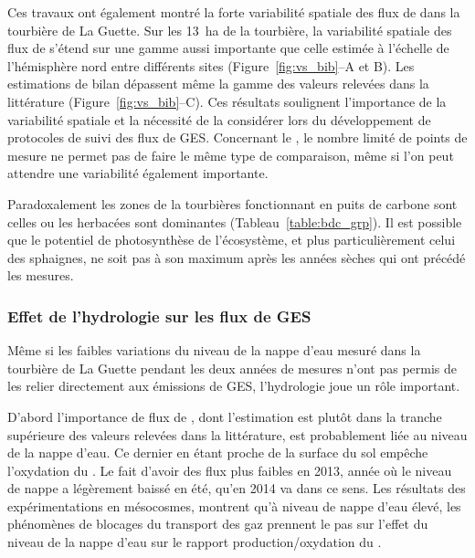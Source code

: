 Ces travaux ont également montré la forte variabilité spatiale des flux de \coo dans la tourbière de La Guette.
Sur les \SI{13}{\hectare} de la tourbière, la variabilité spatiale des flux de \coo s'étend sur une gamme aussi importante que celle estimée à l'échelle de l'hémisphère nord entre différents sites (Figure~\ref{fig:vs_bib}--A et B).
Les estimations de bilan dépassent même la gamme des valeurs relevées dans la littérature (Figure~\ref{fig:vs_bib}--C).
Ces résultats soulignent l'importance de la variabilité spatiale et la nécessité de la considérer lors du développement de protocoles de suivi des flux de GES.
Concernant le \chh, le nombre limité de points de mesure ne permet pas de faire le même type de comparaison, même si l'on peut attendre une variabilité également importante.

Paradoxalement les zones de la tourbières fonctionnant en puits de carbone sont celles ou les herbacées sont dominantes (Tableau~\ref{table:bdc_grp}).
Il est possible que le potentiel de photosynthèse de l'écosystème, et plus particulièrement celui des sphaignes, ne soit pas à son maximum après les années sèches qui ont précédé les mesures.

\subsubsection{Effet de l'hydrologie sur les flux de GES}

Même si les faibles variations du niveau de la nappe d'eau mesuré dans la tourbière de La Guette pendant les deux années de mesures n'ont pas permis de les relier directement aux émissions de GES, l'hydrologie joue un rôle important.

D'abord l'importance de flux de \chh, dont l'estimation est plutôt dans la tranche supérieure des valeurs relevées dans la littérature, est probablement liée au niveau de la nappe d'eau.
Ce dernier en étant proche de la surface du sol empêche l'oxydation du \chh.
Le fait d'avoir des flux plus faibles en 2013, année où le niveau de nappe a légèrement baissé en été, qu'en 2014 va dans ce sens.
Les résultats des expérimentations en mésocosmes, montrent qu'à niveau de nappe d'eau élevé, les phénomènes de blocages du transport des gaz prennent le pas sur l'effet du niveau de la nappe d'eau sur le rapport production/oxydation du \chh.

